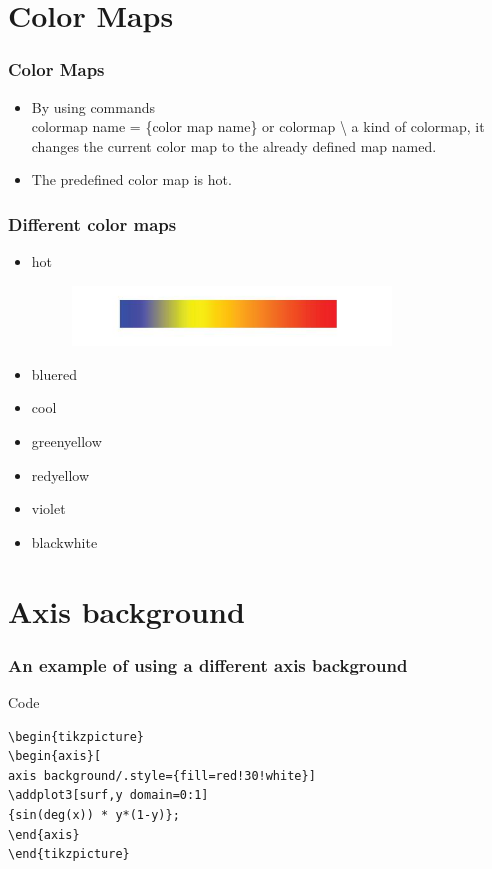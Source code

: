 \documentclass{beamer}
\begin{document}
\section{Color Maps}
\begin{frame}[fragile]
\frametitle{Color Maps}
\begin{itemize}
\item By using commands\\
\color{blue} colormap name \color{black} = \{color map name\} or \color{blue} colormap \textbackslash \color{black} a kind of colormap, it changes the current color map to the already defined map named.
\item The predefined color map is hot.
\end{itemize}
\end{frame}
\begin{frame}[fragile]
\frametitle{Different color maps}
\begin{itemize}
\item hot
\begin{figure}
\centering
\includegraphics[width=0.8\textwidth]{fig4.jpg}
\end{figure}
\item bluered
\item cool
\item greenyellow
\item redyellow
\item violet
\item blackwhite
\end{itemize}
\end{frame}
\section{Axis background}
\begin{frame}[fragile]
\frametitle{An example of using a different axis background}
\begin{block}{Code}
\begin{verbatim}
\begin{tikzpicture}
\begin{axis}[
axis background/.style={fill=red!30!white}]
\addplot3[surf,y domain=0:1]
{sin(deg(x)) * y*(1-y)};
\end{axis}
\end{tikzpicture}
\end{verbatim}
\end{block}
\end{frame}
\end{document}
